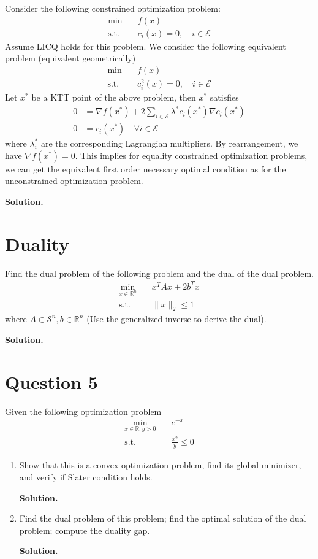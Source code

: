 \documentclass{article}
\begin{document}
\bigskip
Consider the following constrained optimization problem:
\begin{align*}
    \min \quad &f(x) \\
    \text{s.t.} \quad &c_i(x) = 0, \quad i \in \mathcal E 
\end{align*}
Assume LICQ holds for this problem. We consider the following equivalent problem (equivalent geometrically)
\begin{align*}
    \min \quad &f(x) \\
    \text{s.t.} \quad &c_i^2(x) = 0, \quad i \in \mathcal E
\end{align*}
Let $x^*$ be a KTT point of the above problem, then $x^*$ satisfies 
\begin{align*}
    0 &= \nabla f(x^*) + 2 \sum_{i \in \mathcal E} \lambda^* c_i(x^*) \nabla c_i(x^*) \\
    0 &= c_i(x^*) \quad \forall i \in \mathcal E
\end{align*}
where $\lambda_i^*$ are the corresponding Lagrangian multipliers. By rearrangement, we have $\nabla f(x^*) = 0$. This implies for equality constrained optimization problems, we can get the equivalent first order necessary optimal condition as for the unconstrained optimization problem.

\textbf{Solution.}

\section{Duality}
Find the dual problem of the following problem and the dual of the dual problem.
\begin{align*}
    \min_{x \in \mathbb R^n} \quad & x^TAx + 2b^T x \\
    \text{s.t.} \quad & \|x\|_2 \leq 1
\end{align*}
where $A \in \mathcal S^n, b \in \mathbb R^n$ (Use the generalized inverse to derive the dual).

\textbf{Solution.}

\section{Question 5}
Given the following optimization problem 
\begin{align*}
    \min_{x \in \mathbb R, y > 0} \quad & e^{-x} \\
    \text{s.t.} \quad & \frac{x^2}{y} \leq 0
\end{align*}
\begin{enumerate}
    \item Show that this is a convex optimization problem, find its global minimizer, and verify if Slater condition holds.
    
    \textbf{Solution.}
    \item Find the dual problem of this problem; find the optimal solution of the dual problem; compute the duality gap.
    
    \textbf{Solution.}
\end{enumerate}
\end{document}

